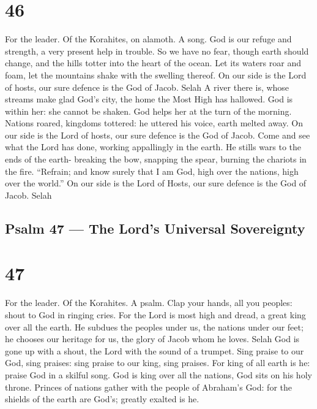 \hypertarget{section-45}{%
\section{46}\label{section-45}}

For the leader. Of the Korahites, on alamoth. A song.  God
is our refuge and strength, a very present help in trouble. 
So we have no fear, though earth should change, and the hills totter
into the heart of the ocean.  Let its waters roar and foam,
let the mountains shake with the swelling thereof. On our side is the
Lord of hosts, our sure defence is the God of Jacob. Selah 
A river there is, whose streams make glad God's city, the home the Most
High has hallowed.  God is within her: she cannot be shaken.
God helps her at the turn of the morning.  Nations roared,
kingdoms tottered: he uttered his voice, earth melted away. 
On our side is the Lord of hosts, our sure defence is the God of Jacob.
 Come and see what the Lord has done, working appallingly in
the earth.  He stills wars to the ends of the earth-
breaking the bow, snapping the spear, burning the chariots in the fire.
 ``Refrain; and know surely that I am God, high over the
nations, high over the world.''  On our side is the Lord of
Hosts, our sure defence is the God of Jacob. Selah

\hypertarget{psalm-47-the-lords-universal-sovereignty}{%
\subsection{Psalm 47 --- The Lord's Universal
Sovereignty}\label{psalm-47-the-lords-universal-sovereignty}}

\hypertarget{section-46}{%
\section{47}\label{section-46}}

For the leader. Of the Korahites. A psalm.  Clap your hands,
all you peoples: shout to God in ringing cries.  For the
Lord is most high and dread, a great king over all the earth.
 He subdues the peoples under us, the nations under our
feet;  he chooses our heritage for us, the glory of Jacob
whom he loves. Selah  God is gone up with a shout, the Lord
with the sound of a trumpet.  Sing praise to our God, sing
praises: sing praise to our king, sing praises.  For king of
all earth is he: praise God in a skilful song.  God is king
over all the nations, God sits on his holy throne.  Princes
of nations gather with the people of Abraham's God: for the shields of
the earth are God's; greatly exalted is he.

